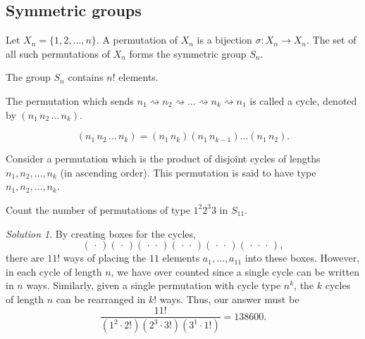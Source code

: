 \documentclass[11pt]{article}
\theoremstyle{definition}
\theoremstyle{remark}
\newtheorem*{solution}{Solution}
\numberwithin{equation}{section}
\begin{document}
    \subsection{Symmetric groups}
    \begin{definition}
        Let $X_n = \{1, 2, \dots, n\}$. A permutation of $X_n$ is a bijection
        $\sigma\colon X_n \to X_n$. The set of all such permutations of $X_n$ forms
        the symmetric group $S_n$.
    \end{definition}

    \begin{lemma}
        The group $S_n$ contains $n!$ elements.
    \end{lemma}

    \begin{definition}
        The permutation which sends $n_1 \rightsquigarrow n_2 \rightsquigarrow \dots
        \rightsquigarrow n_k \rightsquigarrow n_1$ is called a cycle, denoted by
        $(n_1\, n_2\, \dots \, n_k)$.
    \end{definition}

    \begin{lemma}
        \[
            (n_1\, n_2\, \dots\, n_k) = (n_1\, n_k) (n_1\, n_{k - 1}) \dots (n_1\, n_2).
        \] 
    \end{lemma}

    \begin{definition}
        Consider a permutation which is the product of disjoint cycles of lengths
        $n_1, n_2, \dots, n_k$ (in ascending order). This permutation is said to have
        type $n_1, n_2, \dots, n_k$.
    \end{definition}

    \begin{exercise}
        Count the number of permutations of type $1^2 2^3 3$ in $S_{11}$.
        \begin{solution}
            By creating boxes for the cycles, \[
                (\,\cdot\,) (\,\cdot\,)
                (\,\cdot\,\cdot\,)(\,\cdot\,\cdot\,)(\,\cdot\,\cdot\,)
                (\,\cdot\,\cdot\,\cdot\,),
            \] there are $11!$ ways of placing the $11$ elements $a_1, \dots, a_{11}$
            into these boxes. However, in each cycle of length $n$, we have
            over counted since a single cycle can be written in $n$ ways. Similarly,
            given a single permutation with cycle type $n^k$, the $k$ cycles of
            length $n$ can be rearranged in $k!$ ways. Thus, our answer must be \[
                \frac{11!}{(1^2\cdot 2!)(2^3\cdot 3!)(3^1\cdot 1!)} = 138600.
            \]
        \end{solution}
    \end{exercise}
\end{document}
